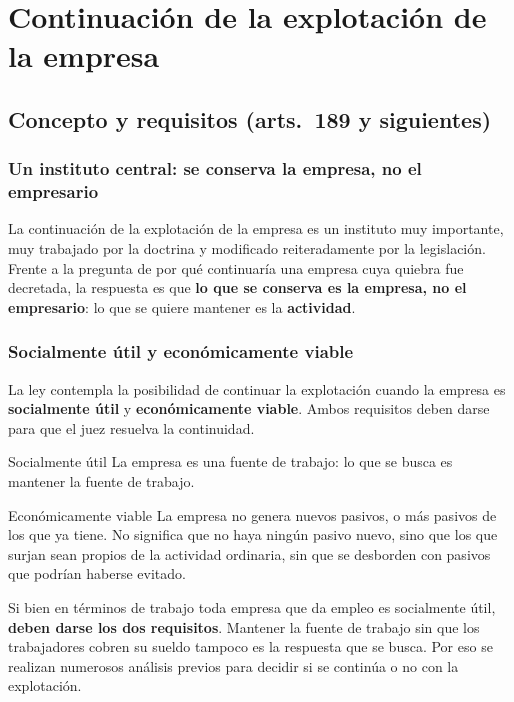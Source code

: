 \documentclass[12pt,oneside]{book}
\begin{document}
\chapter[Continuación de la explotación]{Continuación de la explotación de la empresa}

\section{Concepto y requisitos (arts.~189 y siguientes)}

\subsection{Un instituto central: se conserva la empresa, no el empresario}

La continuación de la explotación de la empresa es un instituto muy importante, muy trabajado por la doctrina y modificado reiteradamente por la legislación. Frente a la pregunta de por qué continuaría una empresa cuya quiebra fue decretada, la respuesta es que \textbf{lo que se conserva es la empresa, no el empresario}: lo que se quiere mantener es la \textbf{actividad}.

\subsection{Socialmente útil y económicamente viable}

La ley contempla la posibilidad de continuar la explotación cuando la empresa es \textbf{socialmente útil} y \textbf{económicamente viable}. Ambos requisitos deben darse para que el juez resuelva la continuidad.

\begin{definition}{Socialmente útil}
La empresa es una fuente de trabajo: lo que se busca es mantener la fuente de trabajo.
\end{definition}

\begin{definition}{Económicamente viable}
La empresa no genera nuevos pasivos, o más pasivos de los que ya tiene. No significa que no haya ningún pasivo nuevo, sino que los que surjan sean propios de la actividad ordinaria, sin que se desborden con pasivos que podrían haberse evitado.
\end{definition}

Si bien en términos de trabajo toda empresa que da empleo es socialmente útil, \textbf{deben darse los dos requisitos}. Mantener la fuente de trabajo sin que los trabajadores cobren su sueldo tampoco es la respuesta que se busca. Por eso se realizan numerosos análisis previos para decidir si se continúa o no con la explotación.
\end{document}
